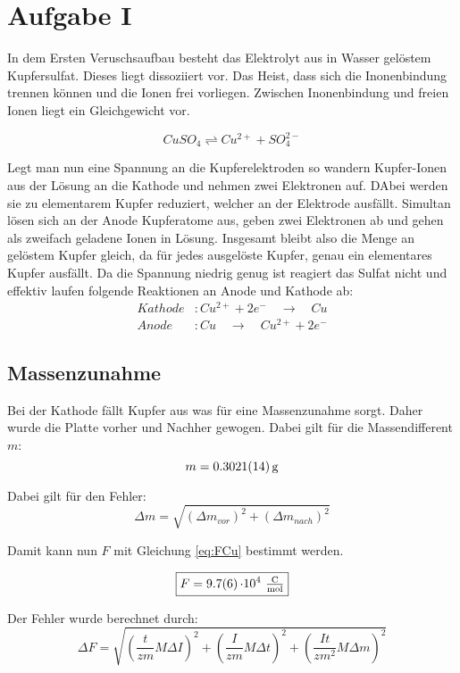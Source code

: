 \section{Aufgabe I}
In dem Ersten Veruschsaufbau besteht das Elektrolyt aus in Wasser gelöstem Kupfersulfat. Dieses liegt dissoziiert vor.
Das Heist, dass sich die Inonenbindung trennen können und die Ionen frei vorliegen. Zwischen Inonenbindung und freien Ionen liegt ein Gleichgewicht vor.

\[CuSO_4 \rightleftharpoons Cu ^{2+} + SO_4^{2-}\]

Legt man nun eine Spannung an die Kupferelektroden so wandern Kupfer-Ionen aus der Lösung an die Kathode und nehmen zwei Elektronen auf. DAbei werden sie zu elementarem Kupfer reduziert,
welcher an der Elektrode ausfällt. Simultan lösen sich an der Anode Kupferatome aus, geben zwei Elektronen ab und gehen als zweifach geladene Ionen in Lösung.
Insgesamt bleibt also die Menge an gelöstem Kupfer gleich, da für jedes ausgelöste Kupfer, genau ein elementares Kupfer ausfällt.
Da die Spannung niedrig genug ist reagiert das Sulfat nicht und effektiv laufen folgende Reaktionen an Anode und Kathode ab:
\begin{align}
    Kathode&:Cu^{2+} + 2e^- \quad\rightarrow  \quad Cu\\
    Anode &: Cu \quad\rightarrow  \quad Cu^{2+} + 2e^-
\end{align}

\subsection{Massenzunahme}

Bei der Kathode fällt Kupfer aus was für eine Massenzunahme sorgt. Daher wurde die Platte vorher und Nachher gewogen. Dabei gilt für die Massendifferent $m$:
\[ m= \SI{0,3021 \pm 0,0014}{\gram}\]

Dabei gilt für den Fehler:
\begin{equation}
    \Delta m = \sqrt{(\Delta m_{vor})^2 + (\Delta m_{nach})^2}
\end{equation}

Damit kann nun $F$ mit Gleichung \ref{eq:FCu} bestimmt werden.

\[\boxed{F = \SI{9,7\pm 0,6}{\cdot 10^{4}\ \tfrac{\coulomb}{\mole}}}\]

Der Fehler wurde berechnet durch:
\begin{equation}
    \Delta F = \sqrt{\left(\frac{t}{zm} M \Delta I\right)^2 + \left(\frac{I}{zm} M \Delta t\right)^2 + \left(\frac{It }{z m^2} M\Delta m\right)^2}
\end{equation}


